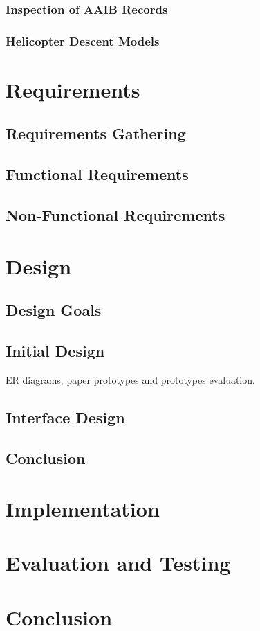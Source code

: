 \documentclass[12pt,a4paper, titlepage]{article}
\begin{document}
\subsubsection{Inspection of AAIB Records}
\subsubsection{Helicopter Descent Models}

\section{Requirements}

\subsection{Requirements Gathering}
\subsection{Functional Requirements}
\subsection{Non-Functional Requirements} 

\section{Design}

\subsection{Design Goals}
\subsection{Initial Design}
ER diagrams, paper prototypes and prototypes evaluation.
\subsection{Interface Design}
\subsection{Conclusion}

\section{Implementation}

\section{Evaluation and Testing}


\section{Conclusion}
\end{document}
